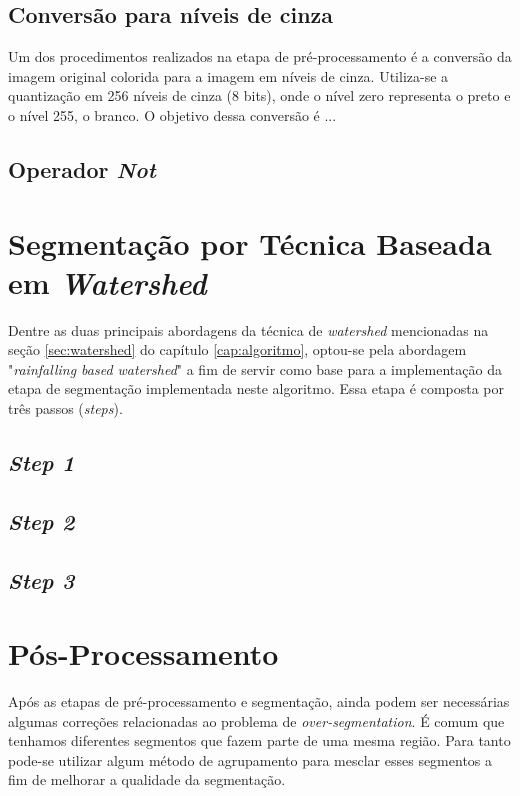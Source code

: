 
\subsection{Conversão para níveis de cinza}
Um dos procedimentos realizados na etapa de pré-processamento é a conversão da imagem original colorida para a imagem em níveis de cinza. Utiliza-se a quantização em 256 níveis de cinza (8 bits), onde o nível zero representa o preto e o nível 255, o branco.
O objetivo dessa conversão é ...


\subsection{Operador \textit{Not}}

\section{Segmentação por Técnica Baseada em \textit{Watershed}}
Dentre as duas principais abordagens da técnica de \textit{watershed} mencionadas na seção \ref{sec:watershed} do capítulo \ref{cap:algoritmo}, optou-se pela abordagem "\textit{rainfalling based watershed}" a fim de servir como base para a implementação da etapa de segmentação implementada neste algoritmo. Essa etapa é composta por três passos (\textit{steps}). 

\subsection{\textit{Step 1}}
 
\subsection{\textit{Step 2}}

\subsection{\textit{Step 3}}

\section{Pós-Processamento}
Após as etapas de pré-processamento e segmentação, ainda podem ser necessárias algumas correções relacionadas ao problema de \textit{over-segmentation}. É comum que tenhamos diferentes segmentos que fazem parte de uma mesma região. Para tanto pode-se utilizar algum método de  agrupamento para mesclar esses segmentos a fim de melhorar a qualidade da segmentação.